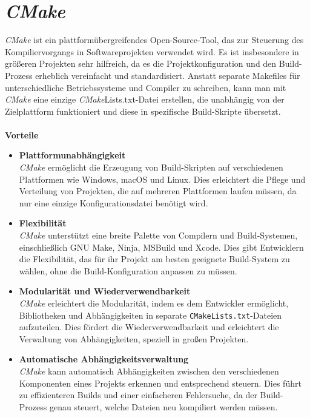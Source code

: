 \section{\textit{CMake}}
\label{sec:tooling-cmake}
\textit{CMake} ist ein plattformübergreifendes Open-Source-Tool, das zur Steuerung des Kompiliervorgangs in Softwareprojekten verwendet wird.
Es ist insbesondere in größeren Projekten sehr hilfreich, da es die Projektkonfiguration und den Build-Prozess erheblich vereinfacht und standardisiert.
Anstatt separate Makefiles für unterschiedliche Betriebssysteme und Compiler zu schreiben, kann man mit \textit{CMake} eine einzige \textit{CMake}Lists.txt-Datei erstellen, die unabhängig von der Zielplattform funktioniert und diese in spezifische Build-Skripte übersetzt. \cite{Cmake2024}\\\\
\textbf{Vorteile}
\begin{itemize}
    \item \textbf{Plattformunabhängigkeit}\\
    \textit{CMake} ermöglicht die Erzeugung von Build-Skripten auf verschiedenen Plattformen wie Windows, macOS und Linux.
    Dies erleichtert die Pflege und Verteilung von Projekten, die auf mehreren Plattformen laufen müssen, da nur eine einzige Konfigurationsdatei benötigt wird.
    \item \textbf{Flexibilität}\\
    \textit{CMake} unterstützt eine breite Palette von Compilern und Build-Systemen, einschließlich GNU Make, Ninja, MSBuild und Xcode.
    Dies gibt Entwicklern die Flexibilität, das für ihr Projekt am besten geeignete Build-System zu wählen, ohne die Build-Konfiguration anpassen zu müssen.
    \item \textbf{Modularität und Wiederverwendbarkeit}\\
    \textit{CMake} erleichtert die Modularität, indem es dem Entwickler ermöglicht, Bibliotheken und Abhängigkeiten in separate \texttt{CMakeLists.txt}-Dateien aufzuteilen.
    Dies fördert die Wiederverwendbarkeit und erleichtert die Verwaltung von Abhängigkeiten, speziell in großen Projekten.
    \item \textbf{Automatische Abhängigkeitsverwaltung}\\
    \textit{CMake} kann automatisch Abhängigkeiten zwischen den verschiedenen Komponenten eines Projekts erkennen und entsprechend steuern.
    Dies führt zu effizienteren Builds und einer einfacheren Fehlersuche, da der Build-Prozess genau steuert, welche Dateien neu kompiliert werden müssen.
\end{itemize}
